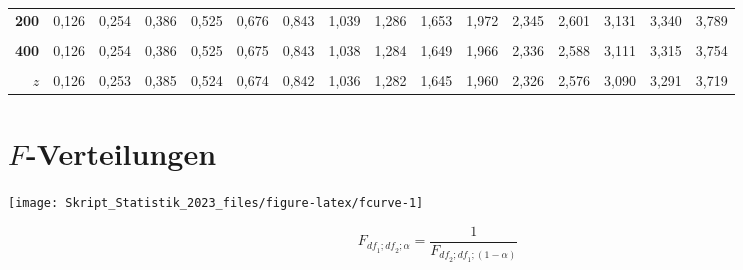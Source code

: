 \documentclass[
  11pt,
  ngerman,
  a4paper,
]{report}
\begin{document}
\begin{table}[H]
{\begin{tabular}{>{}r|rrrrrrrrrrrrrrr}
\textbf{200} & 0,126 & 0,254 & 0,386 & 0,525 & 0,676 & 0,843 & 1,039 & 1,286 & 1,653 & 1,972 & 2,345 & 2,601 & 3,131 & 3,340 & 3,789\\
\addlinespace
\textbf{\cellcolor{gray!6}{300}} & \cellcolor{gray!6}{0,126} & \cellcolor{gray!6}{0,254} & \cellcolor{gray!6}{0,386} & \cellcolor{gray!6}{0,525} & \cellcolor{gray!6}{0,675} & \cellcolor{gray!6}{0,843} & \cellcolor{gray!6}{1,038} & \cellcolor{gray!6}{1,284} & \cellcolor{gray!6}{1,650} & \cellcolor{gray!6}{1,968} & \cellcolor{gray!6}{2,339} & \cellcolor{gray!6}{2,592} & \cellcolor{gray!6}{3,118} & \cellcolor{gray!6}{3,323} & \cellcolor{gray!6}{3,765}\\
\textbf{400} & 0,126 & 0,254 & 0,386 & 0,525 & 0,675 & 0,843 & 1,038 & 1,284 & 1,649 & 1,966 & 2,336 & 2,588 & 3,111 & 3,315 & 3,754\\
\textbf{\cellcolor{gray!6}{500}} & \cellcolor{gray!6}{0,126} & \cellcolor{gray!6}{0,253} & \cellcolor{gray!6}{0,386} & \cellcolor{gray!6}{0,525} & \cellcolor{gray!6}{0,675} & \cellcolor{gray!6}{0,842} & \cellcolor{gray!6}{1,038} & \cellcolor{gray!6}{1,283} & \cellcolor{gray!6}{1,648} & \cellcolor{gray!6}{1,965} & \cellcolor{gray!6}{2,334} & \cellcolor{gray!6}{2,586} & \cellcolor{gray!6}{3,107} & \cellcolor{gray!6}{3,310} & \cellcolor{gray!6}{3,747}\\
\textbf{$z$} & 0,126 & 0,253 & 0,385 & 0,524 & 0,674 & 0,842 & 1,036 & 1,282 & 1,645 & 1,960 & 2,326 & 2,576 & 3,090 & 3,291 & 3,719\\
\bottomrule
\end{tabular}}
\end{table}

\pagebreak

\hypertarget{tabelle-f}{%
\section*{\texorpdfstring{\(F\)-Verteilungen}{F-Verteilungen}}\label{tabelle-f}}

\begin{multicols}{2}
\vfill


\begin{center}\texttt{[image: Skript\_Statistik\_2023\_files/figure-latex/fcurve-1]} \end{center}

\vfill
\columnbreak
\vfill

$$
F_{\textit{df}_1;\textit{df}_2;\alpha}=\frac{1}{F_{\textit{df}_2;\textit{df}_1;(1-\alpha)}} 
$$

\vfill
\end{multicols}
\end{document}
